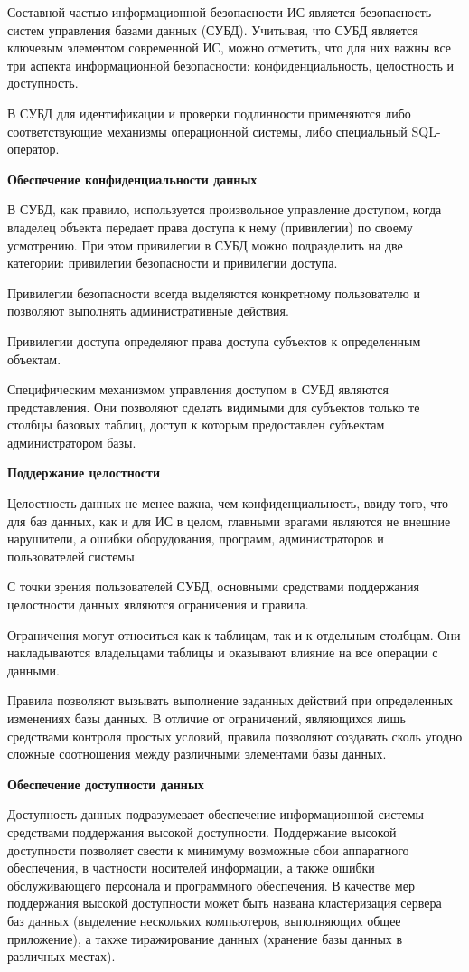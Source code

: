 Составной частью информационной безопасности ИС является безопасность систем управления базами данных (СУБД). Учитывая, что СУБД является ключевым элементом современной ИС, можно отметить, что для них важны все три аспекта информационной безопасности: конфиденциальность, целостность и доступность.

В СУБД для идентификации и проверки подлинности применяются либо соответствующие механизмы операционной системы, либо специальный SQL-оператор.

\bigbreak
\textbf{Обеспечение конфиденциальности данных}

В СУБД, как правило, используется произвольное управление доступом, когда владелец объекта передает права доступа к нему (привилегии) по своему усмотрению. При этом привилегии в СУБД можно подразделить на две категории: привилегии безопасности и привилегии доступа.

Привилегии безопасности всегда выделяются конкретному пользователю и позволяют выполнять административные действия.

Привилегии доступа определяют права доступа субъектов к определенным объектам.

Специфическим механизмом управления доступом в СУБД являются представления. Они позволяют сделать видимыми для субъектов только те столбцы базовых таблиц, доступ к которым предоставлен субъектам администратором базы.

\bigbreak
\textbf{Поддержание целостности}

Целостность данных не менее важна, чем конфиденциальность, ввиду того, что для баз данных, как и для ИС в целом, главными врагами являются не внешние нарушители, а ошибки оборудования, программ, администраторов и пользователей системы.

С точки зрения пользователей СУБД, основными средствами поддержания целостности данных являются ограничения и правила.

Ограничения могут относиться как к таблицам, так и к отдельным столбцам. Они накладываются владельцами таблицы и оказывают влияние на все операции с данными.

Правила позволяют вызывать выполнение заданных действий при определенных изменениях базы данных. В отличие от ограничений, являющихся лишь средствами контроля простых условий, правила позволяют создавать сколь угодно сложные соотношения между различными элементами базы данных.

\bigbreak
\textbf{Обеспечение доступности данных}

Доступность данных подразумевает обеспечение информационной системы средствами поддержания высокой доступности. Поддержание высокой доступности позволяет свести к минимуму возможные сбои аппаратного обеспечения, в частности носителей информации, а также ошибки обслуживающего персонала и программного обеспечения. В качестве мер поддержания высокой доступности может быть названа кластеризация сервера баз данных (выделение нескольких компьютеров, выполняющих общее приложение), а также тиражирование данных (хранение базы данных в различных местах).

